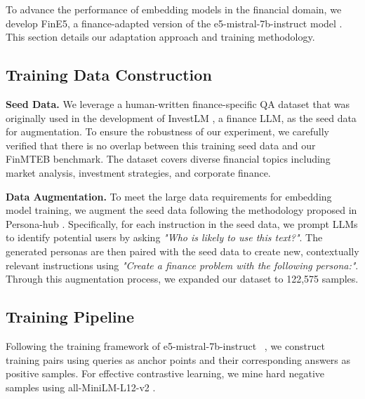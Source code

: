 
\begin{center}
    
\end{center}

To advance the performance of embedding models in the financial domain, we develop FinE5, a finance-adapted version of the e5-mistral-7b-instruct model \citep{e5}. This section details our adaptation approach and training methodology.

\subsection{Training Data Construction}
\textbf{Seed Data. }We leverage a human-written finance-specific QA dataset that was originally used in the development of InvestLM \citep{investlm}, a finance LLM, as the seed data for augmentation. To ensure the robustness of our experiment, we carefully verified that there is no overlap between this training seed data and our FinMTEB benchmark. The dataset covers diverse financial topics including market analysis, investment strategies, and corporate finance. 

\textbf{Data Augmentation. }To meet the large data requirements for embedding model training, we augment the seed data following the methodology proposed in Persona-hub \citep{ge2024scaling}. Specifically, for each instruction in the seed data, we prompt LLMs to identify potential users by asking \textit{"Who is likely to use this text?"}. The generated personas are then paired with the seed data to create new, contextually relevant instructions using \textit{"Create a finance problem with the following persona:"}. Through this augmentation process, we expanded our dataset to 122,575 samples.

\subsection{Training Pipeline}
Following the training framework of e5-mistral-7b-instruct ~\citep{e5}, we construct training pairs using queries as anchor points and their corresponding answers as positive samples. For effective contrastive learning, we mine hard negative samples using all-MiniLM-L12-v2 \citep{sentence-bert}. 



